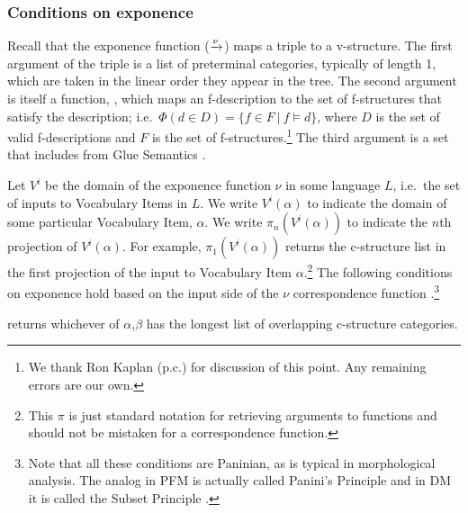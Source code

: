\documentclass[output=paper,hidelinks]{langscibook}
\begin{document}
  

\subsubsection{Conditions on exponence}
\label{sec:Morph:conditions-exponence}  

Recall that the exponence  function ($\xrightarrow{\nu}$) maps a triple
to a v-structure. The first argument of the triple is a
list of preterminal categories, typically of length 1, which are taken
in the linear order they appear in the tree.  The second argument is
itself a function, \fsfunc, which maps an f-description to the set of
f-structures that satisfy the description; i.e.\
$\Phi(d \in D) = \{f \in F\ |\ f \models d\}$, where $D$ is the set of
valid f-descriptions and $F$ is the set of f-structures.\footnote{We
  thank Ron Kaplan (p.c.) for discussion of this point. Any remaining
  errors are our own.}  The third argument is a set that includes
\aterm{meaning constructors} from Glue Semantics
\citep[Glue;][]{Dalrymple:Glue,dalrymple01,DLM:LFG,Asudeh12,asudeh22}.

Let $V^i$ be the domain of the exponence function $\nu$ in some
language $L$, i.e.\ the set of inputs to Vocabulary Items in $L$. We
write $V^i(\alpha)$ to indicate the domain of some particular
Vocabulary Item, $\alpha$. We write $\pi_n(V^i(\alpha))$ to indicate
the $n${th} projection of $V^i(\alpha)$. For example,
$\pi_1(V^i(\alpha))$ returns the c-structure list in the first
projection of the input to Vocabulary Item $\alpha$.\footnote{This
  $\pi$ is just standard notation for retrieving arguments to
  functions and should not be mistaken for a correspondence function.}
The following
conditions on exponence hold based on the input side of the $\nu$
correspondence function
\citep{asudeh;siddiqi-lfg22}.\footnote{Note that all these conditions
  are Paninian, as is typical in morphological analysis. The analog in
PFM is actually called Panini's Principle \citep{Stu01} and in DM it
is called the
Subset Principle \citep{hallemarantz}.}
%
\ea
  \begin{sloppypar}
    \amic[$(\alpha,\beta)$]  returns whichever of $\alpha$,$\beta$ has
  the longest list of overlapping c-structure
  categories.%
  \end{sloppypar}
\end{document}
